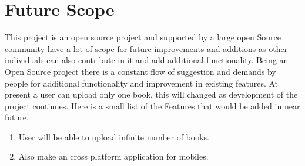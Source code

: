 \section{Future Scope}
This project is an open source project and supported by a large open Source community have a lot of scope for future improvements and additions as other individuals can also contribute in it and add additional functionality. Being an Open Source project there is a constant flow of suggestion and demands by people for additional functionality and improvement in existing features. At present a user can upload only one book, this will changed as development of the project continues. Here is a small list of the Features that would be added in near future.

\begin{enumerate}
\item User will be able to upload infinite number of books.
\item Also make an cross platform application for mobiles.
\end{enumerate}
